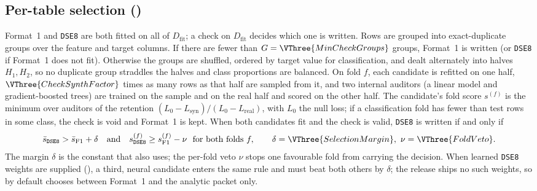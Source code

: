 \subsection{Per-table selection ()}\label{sec:select}
Format~1 and \texttt{DSE8} are both fitted on all of $D_{\mathrm{fit}}$; a check on $D_{\mathrm{fit}}$ decides which one is written.
Rows are grouped into exact-duplicate groups over the feature and target columns.
If there are fewer than $G=\VThree{MinCheckGroups}$ groups, Format~1 is written (or \texttt{DSE8} if Format~1 does not fit).
Otherwise the groups are shuffled, ordered by target value for classification, and dealt alternately into halves $H_1, H_2$, so no duplicate group straddles the halves and class proportions are balanced.
On fold $f$, each candidate is refitted on one half, $\VThree{CheckSynthFactor}$ times as many rows as that half are sampled from it, and two internal auditors (a linear model and gradient-boosted trees) are trained on the sample and on the real half and scored on the other half.
The candidate's fold score $s^{(f)}$ is the minimum over auditors of the retention $(L_0-L_{\mathrm{syn}})/(L_0-L_{\mathrm{real}})$, with $L_0$ the null loss; if a classification fold has fewer than  test rows in some class, the check is void and Format~1 is kept.
When both candidates fit and the check is valid, \texttt{DSE8} is written if and only if
\begin{equation}\label{eq:select}
  \bar s_{\texttt{DSE8}} > \bar s_{\mathrm{F1}} + \delta
  \quad\text{and}\quad
  s^{(f)}_{\texttt{DSE8}} \ge s^{(f)}_{\mathrm{F1}} - \nu \ \text{ for both folds } f,
  \qquad \delta=\VThree{SelectionMargin},\ \nu=\VThree{FoldVeto}.
\end{equation}
The margin $\delta$ is the constant that  also uses; the per-fold veto $\nu$ stops one favourable fold from carrying the decision.
When learned \texttt{DSE8} weights are supplied (), a third, neural candidate enters the same rule and must beat both others by $\delta$; the release ships no such weights, so by default  chooses between Format~1 and the analytic packet only.
